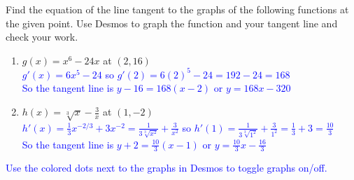 \documentclass{ximera}
\begin{document}
\begin{exercise}
    Find the equation of the line tangent to the graphs of the following functions at the given point.  Use Desmos to graph the function and your tangent line and check your work.
        \begin{enumerate}
            \item $g(x)=x^6-24x$ at $(2, 16)$\\
            \textcolor{blue}{ $g'(x)=6x^5-24$ so $g'(2)=6(2)^5-24=192-24=168$\\
            So the tangent line is $y-16=168(x-2)$ or $y=168x-320$}
            \item $h(x)=\sqrt[3]{x}-\frac{3}{x}$ at $(1, -2)$\\
            \textcolor{blue}{ $h'(x)=\frac{1}{3}x^{-2/3}+3x^{-2}=\frac{1}{3\sqrt[3]{x^2}}+\frac{3}{x^2}$ so $h'(1)=\frac{1}{3\sqrt[3]{1^2}}+\frac{3}{1^2}=\frac{1}{3}+3=\frac{10}{3}$\\
            So the tangent line is $y+2=\frac{10}{3}(x-1)$ or $y=\frac{10}{3}x-\frac{16}{3}$}
        \end{enumerate}
        \begin{center}
        \end{center}
        \textcolor{blue}{Use the colored dots next to the graphs in Desmos to toggle graphs on/off.}
\end{exercise}
\end{document}
